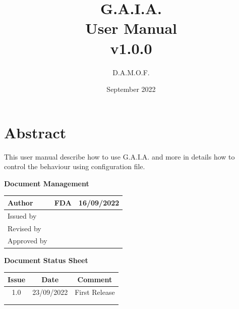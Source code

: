 \documentclass[12pt, a4paper]{book}
\title{\textbf{{\LARGE G.A.I.A.} \\ User Manual \\ {\small v1.0.0} }}
\author{D.A.M.O.F.}
\date{September 2022}
\newcommand*{\thead}[1]{\multicolumn{1}{|c|}{\bfseries #1}}
\begin{document}
\maketitle

\newpage
\section {Abstract}

\begin{justify}
This user manual describe how to use G.A.I.A. and more in details how to control the behaviour using configuration file.
\end{justify}



\tableofcontents


\newpage
\begin{center}
\textbf{{\large Document Management}}
\end{center}

\begin{table}[h]
\centering
	\begin{tabular}{|l|l|c|}
	\hline
	Author & FDA & 16/09/2022 \\
	\hline	
	Issued by & & \\
	\hline
	Revised by & & \\
	\hline
	Approved by & & \\
	\hline
	\end{tabular}	 	
\end{table}

\begin{center}
\textbf{{\large Document Status Sheet}}
\end{center}

\begin{table}[h]
\centering
	\begin{tabular}{|c|c|l|}
	\hline
	\thead{ Issue } & \thead{ Date } & \thead{ Comment } \\
	\hline	
	1.0 & 23/09/2022 & First Release \\
	\hline
	& & \\
	\hline
	& & \\
	\hline
	\end{tabular}	 	
\end{table}
\end{document}
